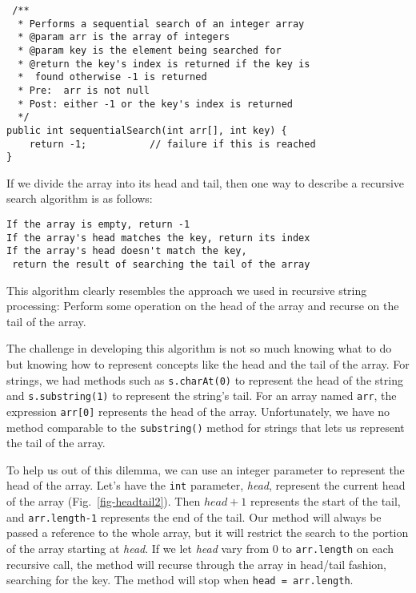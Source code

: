 \begin{jjjlisting}
\begin{lstlisting}
 /**
  * Performs a sequential search of an integer array
  * @param arr is the array of integers
  * @param key is the element being searched for
  * @return the key's index is returned if the key is
  *  found otherwise -1 is returned
  * Pre:  arr is not null
  * Post: either -1 or the key's index is returned
  */
public int sequentialSearch(int arr[], int key) {
    return -1;           // failure if this is reached
}
\end{lstlisting}
\end{jjjlisting}

If we divide the array into its head and tail, then one way to
describe a recursive search algorithm is as follows:

\begin{jjjlisting}
\begin{lstlisting}
If the array is empty, return -1
If the array's head matches the key, return its index
If the array's head doesn't match the key,
 return the result of searching the tail of the array
\end{lstlisting}
\end{jjjlisting}

\noindent This algorithm clearly resembles the approach we used
in recursive string processing: Perform some operation on the head of
the array and recurse on the tail of the array.

The challenge in developing this algorithm is not so much knowing what
to do but knowing how to represent concepts like the head and the tail of
the array.  For strings, we had methods such as {\tt s.charAt(0)} to
represent the head of the string and {\tt s.substring(1)} to represent
the string's tail.  For an array named {\tt arr}, the expression
{\tt arr[0]} represents the head of the array.  Unfortunately, we have no
method comparable to the {\tt substring()} method for strings that
lets us represent the tail of the array.

To help us out of this dilemma, we can use an integer parameter to
represent the head of the array.  Let's have the {\tt int} parameter,
{\it head}, represent the current head of the array
(Fig.~\ref{fig-headtail2}).  Then $head+1$ represents the start of the
tail, and {\tt arr.length-1} represents the end of the tail.  Our
method will always be passed a reference to the whole array, but it
will restrict the search to the portion of the array starting at {\it
head}. If we let {\it head} vary from 0 to {\tt arr.length} on each
recursive call, the method will recurse through the array in
head/tail fashion, searching for the key.  The method will stop when {\tt head =
arr.length}. 

